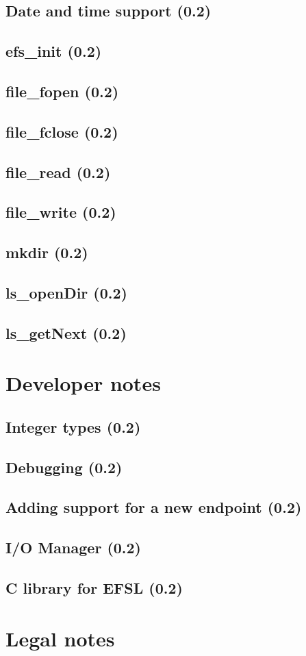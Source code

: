 \documentclass[a4paper,fleqn]{article}
\begin{document}
\subsection{Date and time support (0.2)}
	
	\newpage
\subsection{efs\_init (0.2)}
	
	\newpage
\subsection{file\_fopen (0.2)}
	
	\newpage
\subsection{file\_fclose (0.2)}
	
	\newpage
\subsection{file\_read (0.2)}
	
	\newpage
\subsection{file\_write (0.2)}
	
	\newpage
\subsection{mkdir (0.2)}
	
	\newpage
\subsection{ls\_openDir (0.2)}
	
	\newpage
\subsection{ls\_getNext (0.2)}
	
	\newpage

\newpage
\section{Developer notes}
\subsection{Integer types (0.2)}
	
\subsection{Debugging (0.2)}
	
\subsection{Adding support for a new endpoint (0.2)}
	
\subsection{I/O Manager (0.2)}
	
\subsection{C library for EFSL (0.2)}
	
	
\newpage
\section{Legal notes}
	
\end{document}
